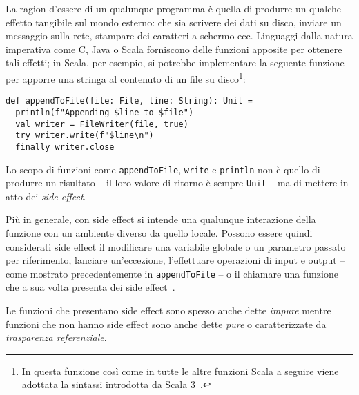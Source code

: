 La ragion d'essere di un qualunque programma è quella di produrre un qualche effetto tangibile sul mondo esterno: che sia scrivere dei dati su disco, inviare un messaggio sulla rete, stampare dei caratteri a schermo ecc.
Linguaggi dalla natura imperativa come C, Java o Scala forniscono delle funzioni apposite per ottenere tali effetti; in Scala, per esempio, si potrebbe implementare la seguente funzione per apporre una stringa al contenuto di un file su disco\footnote{In questa funzione così come in tutte le altre funzioni Scala a seguire viene adottata la sintassi introdotta da Scala 3~\cite{cit:new-in-scala-3}.}:

\begin{lstlisting}[language=scala3]
def appendToFile(file: File, line: String): Unit =
  println(f"Appending $line to $file")
  val writer = FileWriter(file, true)
  try writer.write(f"$line\n")
  finally writer.close
\end{lstlisting}
Lo scopo di funzioni come \lstinline{appendToFile}, \lstinline{write} e \lstinline{println} non è quello di produrre un risultato -- il loro valore di ritorno è sempre \lstinline{Unit} -- ma di mettere in atto dei \emph{side effect}. 

Più in generale, con side effect si intende una qualunque interazione della funzione con un ambiente diverso da quello locale.
Possono essere quindi considerati side effect il modificare una variabile globale o un parametro passato per riferimento, lanciare un'eccezione, l'effettuare operazioni di input e output -- come mostrato precedentemente in \lstinline{appendToFile} -- o il chiamare una funzione che a sua volta presenta dei side effect~\cite{cit:on-the-prevalence-of-function-side-effects-in-general-purpose-open-source-software-systems}.

Le funzioni che presentano side effect sono spesso anche dette \emph{impure} mentre funzioni che non hanno side effect sono anche dette \emph{pure} o caratterizzate da \emph{trasparenza referenziale}.